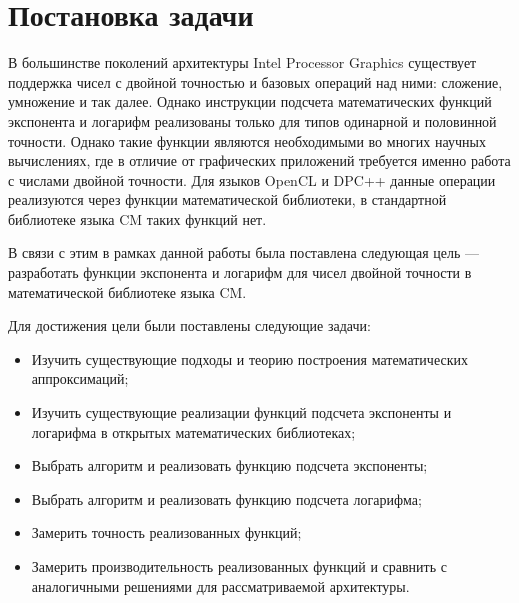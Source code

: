 \chapter{Постановка задачи}

В большинстве поколений архитектуры \foreignlanguage{english}{Intel Processor Graphics} существует поддержка чисел с двойной точностью и базовых операций над ними: сложение, умножение и так далее.
Однако инструкции подсчета математических функций экспонента и логарифм реализованы только для типов одинарной и половинной точности.
Однако такие функции являются необходимыми во многих научных вычислениях, где в отличие от графических приложений требуется именно работа с числами двойной точности.
Для языков OpenCL и DPC++ данные операции реализуются через функции математической библиотеки, в стандартной библиотеке языка CM таких функций нет.

В связи с этим в рамках данной работы была поставлена следующая цель --- разработать функции экспонента и логарифм для чисел двойной точности в математической библиотеке языка CM.

Для достижения цели были поставлены следующие задачи:

\begin{itemize}
    \item Изучить существующие подходы и теорию построения математических аппроксимаций;
    \item Изучить существующие реализации функций подсчета экспоненты и логарифма в открытых
    математических библиотеках;
    \item Выбрать алгоритм и реализовать функцию подсчета экспоненты;
    \item Выбрать алгоритм и реализовать функцию подсчета логарифма;
    \item Замерить точность реализованных функций;
    \item Замерить производительность реализованных функций и сравнить с аналогичными решениями
    для рассматриваемой архитектуры.
\end{itemize}

